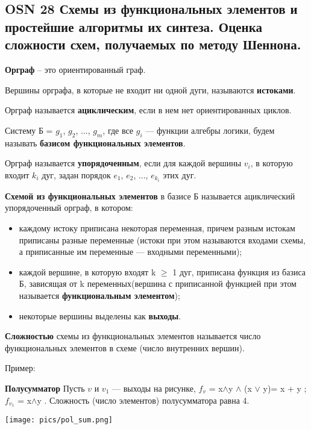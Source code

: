 \subsection{OSN 28 Схемы из функциональных элементов и простейшие алгоритмы их синтеза. Оценка сложности схем, получаемых по методу Шеннона.}

\textbf{Орграф} -- это ориентированный граф.

Вершины орграфа, в которые не входит ни одной дуги, называются \textbf{истоками}.

Орграф называется \textbf{ациклическим}, если в нем нет ориентированных циклов.

Систему Б = {$g_1$, $g_2$, ..., $g_m$}, где все $g_i$ — функции алгебры логики, будем называть \textbf{базисом функциональных элементов}.

Орграф называется \textbf{упорядоченным}, если для каждой вершины $v_i$, в которую входит $k_i$ дуг, задан порядок $e_1$, $e_2$, ..., $e_{k_i}$ этих дуг.

\bigbreak

\textbf{Схемой из функциональных элементов} в базисе Б называется ациклический упорядоченный орграф, в котором:
\begin{itemize}
    \item каждому истоку приписана некоторая переменная, причем разным истокам приписаны разные переменные (истоки при этом называются входами схемы, а приписанные им переменные — входными переменными);
    \item каждой вершине, в которую входят k $\geq$ 1 дуг, приписана функция из базиса Б, зависящая от k переменных(вершина с приписанной функцией при этом называется \textbf{функциональным элементом}); 
    \item некоторые вершины выделены как \textbf{выходы}. 
\end{itemize}

\textbf{Сложностью} схемы из функциональных элементов называется число функциональных элементов в схеме (число внутренних вершин).

Пример:

\textbf{Полусумматор} Пусть $v$ и $v_1$ — выходы на рисунке, $f_v$ = x$\wedge$y $\wedge$ (x $\vee$ y)= x + y ; $f_{v_1}$ = x$\wedge$y . Сложность (число элементов) полусумматора равна 4.

\texttt{[image: pics/pol\_sum.png]}


